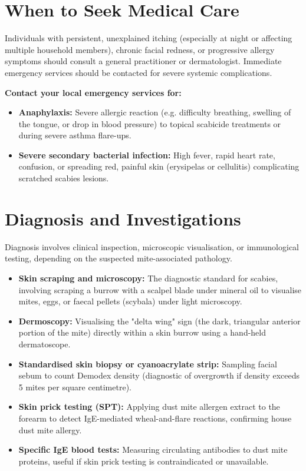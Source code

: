 \section*{When to Seek Medical Care}
Individuals with persistent, unexplained itching (especially at night or affecting multiple household members), chronic facial redness, or progressive allergy symptoms should consult a general practitioner or dermatologist. Immediate emergency services should be contacted for severe systemic complications.

\textbf{Contact your local emergency services for:}
\begin{itemize}
    \item \textbf{Anaphylaxis:} Severe allergic reaction (e.g. difficulty breathing, swelling of the tongue, or drop in blood pressure) to topical scabicide treatments or during severe asthma flare-ups.
    \item \textbf{Severe secondary bacterial infection:} High fever, rapid heart rate, confusion, or spreading red, painful skin (erysipelas or cellulitis) complicating scratched scabies lesions.
\end{itemize}

\section*{Diagnosis and Investigations}
Diagnosis involves clinical inspection, microscopic visualisation, or immunological testing, depending on the suspected mite-associated pathology.
\begin{itemize}
    \item \textbf{Skin scraping and microscopy:} The diagnostic standard for scabies, involving scraping a burrow with a scalpel blade under mineral oil to visualise mites, eggs, or faecal pellets (scybala) under light microscopy.
    \item \textbf{Dermoscopy:} Visualising the "delta wing" sign (the dark, triangular anterior portion of the mite) directly within a skin burrow using a hand-held dermatoscope.
    \item \textbf{Standardised skin biopsy or cyanoacrylate strip:} Sampling facial sebum to count Demodex density (diagnostic of overgrowth if density exceeds 5 mites per square centimetre).
    \item \textbf{Skin prick testing (SPT):} Applying dust mite allergen extract to the forearm to detect IgE-mediated wheal-and-flare reactions, confirming house dust mite allergy.
    \item \textbf{Specific IgE blood tests:} Measuring circulating antibodies to dust mite proteins, useful if skin prick testing is contraindicated or unavailable.
\end{itemize}

